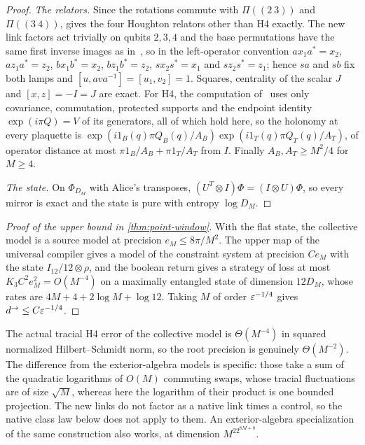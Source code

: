 \begin{proof}
\emph{The relators.} Since the rotations commute with $\Pi((2\ 3))$ and $\Pi((3\ 4))$, \cite[Lemma~6.3]{DM-H3} gives the four
Houghton relators other than H4 exactly. The new link factors act trivially on qubits $2,3,4$ and the base permutations have the
same first inverse images as in~\cite{DM-H3}, so in the left-operator convention $ax_1a^*=x_2$, $az_1a^*=z_2$, $bx_1b^*=x_2$,
$bz_1b^*=z_2$, $sx_2s^*=x_1$ and $sz_2s^*=z_1$; hence $sa$ and $sb$ fix both lamps and $[u,ava^{-1}]=[u_1,v_2]=1$. Squares, centrality
of the scalar $J$ and $[x,z]=-I=J$ are exact. For H4, the computation of~\cite[Lemma~6.4]{DM-H3} uses only covariance,
commutation, protected supports and the endpoint identity $\exp(i\pi Q)=V$ of its generators, all of which hold here, so the
holonomy at every plaquette is $\exp(i1_B(q)\pi Q_B(q)/A_B)\exp(i1_T(q)\pi Q_T(q)/A_T)$, of operator distance at most
$\pi1_B/A_B+\pi1_T/A_T$ from $I$. Finally $A_B,A_T\ge M^2/4$ for $M\ge4$.

\emph{The state.} On $\Phi_{D_M}$ with Alice's transposes, $(U^T\otimes I)\Phi=(I\otimes U)\Phi$, so every mirror is exact and the
state is pure with entropy $\log D_M$.
\end{proof}

\begin{proof}[Proof of the upper bound in \cref{thm:point-window}]
With the flat state, the collective model is a source model at precision $e_M\le8\pi/M^2$. The upper map of the universal compiler
gives a model of the constraint system at precision $Ce_M$ with the state $I_{12}/12\otimes\rho$, and the boolean return gives a
strategy of loss at most $K_3C^2e_M^2=O(M^{-4})$ on a maximally entangled state of dimension $12D_M$, whose rates are
$4M+4+2\log M+\log12$. Taking $M$ of order $\varepsilon^{-1/4}$ gives $d^\to\le C\varepsilon^{-1/4}$.
\end{proof}

\begin{remark}\label{rem:point-collective}
The actual tracial H4 error of the collective model is $\Theta(M^{-4})$ in squared normalized Hilbert--Schmidt norm, so the root
precision is genuinely $\Theta(M^{-2})$. The difference from the exterior-algebra models is specific: those take a sum of the
quadratic logarithms of $O(M)$ commuting swaps, whose tracial fluctuations are of size $\sqrt M$, whereas here the logarithm of
their product is one bounded projection. The new links do not factor as a native link times a control, so the native class law
below does not apply to them. An exterior-algebra specialization of the same construction also works, at dimension
$M^22^{8M+8}$.
\end{remark}

